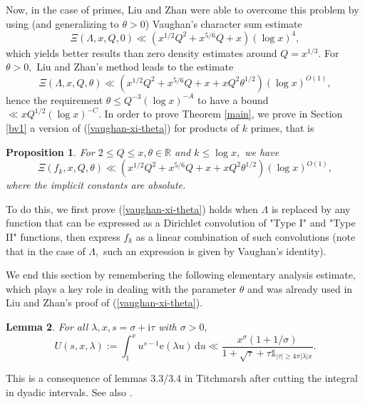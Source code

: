 \documentclass{article}
\newtheorem{prop}{Proposition}
\newtheorem{lemma}[prop]{Lemma}
\newcommand{\e}{\mathrm{e}}
\newcommand{\de}{\,\mathrm{d}}
\newcommand{\ii}{\mathrm{i}}
\newcommand{\R}{\mathds{R}}
\newcommand{\Ind}{\mathbb{1}}
\begin{document}
Now, in the case of primes, Liu and Zhan \cite{liuzhan} were able to overcome this problem by using (and generalizing to $\theta > 0$) Vaughan's character sum estimate \cite{vaughan-bv}
\begin{equation}\label{vaughan-xi}
    \Xi(\Lambda, x, Q,0) \ll \left(x^{1/2}Q^2 + x^{5/6}Q + x\right)(\log x)^{4},
\end{equation}
which yields better results than zero density estimates around $Q = x^{1/3}.$ For $\theta > 0,$ Liu and Zhan's method leads to the estimate 
\begin{equation}\label{vaughan-xi-theta}
    \Xi(\Lambda, x, Q,\theta) \ll \left(x^{1/2}Q^2 + x^{5/6}Q + x + xQ^2\theta^{1/2}\right)(\log x)^{O(1)},
\end{equation} hence the requirement $\theta \le Q^{-3}(\log x)^{-A}$ to have a bound $\ll xQ^{1/2}(\log x)^{-C}.$
In order to prove Theorem \ref{main}, we prove in Section \ref{bv1} a version of (\ref{vaughan-xi-theta}) for products of $k$ primes, that is
\begin{prop}\label{xi-pik}
    For $2\le Q \le x, \theta\in\R$ and $k \le \log x,$ we have
    $$\Xi(f_k, x, Q,\theta) \ll \left(x^{1/2}Q^2 + x^{5/6}Q + x + xQ^2\theta^{1/2}\right)(\log x)^{O(1)},$$ where the implicit constants are absolute.
\end{prop}
To do this, we first prove (\ref{vaughan-xi-theta}) holds when $\Lambda$ is replaced by any function that can be expressed as a Dirichlet convolution of "Type I" and "Type II" functions, then express $f_k$ as a linear combination of such convolutions (note that in the case of $\Lambda,$ such an expression is given by Vaughan's identity).

We end this section by remembering the following elementary analysis estimate, which plays a key role in dealing with the parameter $\theta$ and was already used in Liu and Zhan's proof of (\ref{vaughan-xi-theta}).

\begin{lemma}\label{lambda-term}
    For all $\lambda, x, s = \sigma + \ii\tau$ with $\sigma > 0,$
    $$U(s,x, \lambda) := \int_1^x u^{s-1} \e(\lambda u) \de u \ll \frac{x^\sigma(1 + 1/\sigma)}{1 + \sqrt{\tau} + \tau\Ind_{|\tau| \ge 4\pi|\lambda| x}}.$$
\end{lemma}
This is a consequence of lemmas 3.3/3.4 in Titchmarsh \cite{titchmarsh} after cutting the integral in dyadic intervals. See also \cite[Lemma 8]{liuzhan}.
\end{document}
